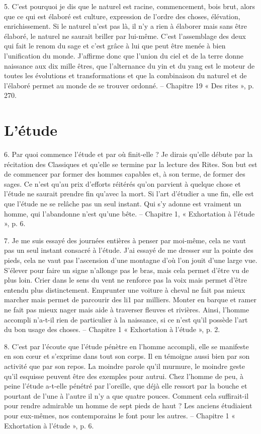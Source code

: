5.	C’est pourquoi je dis que le naturel est racine, commencement, bois brut, alors que ce qui est élaboré est culture, expression de l’ordre des choses, élévation, enrichissement. Si le naturel n’est pas là, il n’y a rien à élaborer mais sans être élaboré, le naturel ne saurait briller par lui-même. C’est l’assemblage des deux qui fait le renom du sage et c’est grâce à lui que peut être menée à bien l’unification du monde. J’affirme donc que l’union du ciel et de la terre donne naissance aux dix mille êtres, que l’alternance du yin et du yang est le moteur de toutes les évolutions et transformations et que la combinaison du naturel et de l’élaboré permet au monde de se trouver ordonné.
-- Chapitre 19 « Des rites », p. 270.


\section{L’étude}


6.	Par quoi commence l’étude et par où finit-elle ? Je dirais qu’elle débute par la récitation des Classiques et qu’elle se termine par la lecture des Rites. Son but est de commencer par former des hommes capables et, à son terme, de former des sages. Ce n’est qu’au prix d’efforts réitérés qu’on parvient à quelque chose et l’étude ne saurait prendre fin qu’avec la mort. Si l’art d’étudier a une fin, elle est que l’étude ne se relâche pas un seul instant. Qui s’y adonne est vraiment un homme, qui l’abandonne n’est qu’une bête.
-- Chapitre 1, « Exhortation à l’étude », p. 6.

7.	Je me suis essayé des journées entières à penser par moi-même, cela ne vaut pas un seul instant consacré à l’étude. J’ai essayé de me dresser sur la pointe des pieds, cela ne vaut pas l’ascension d’une montagne d’où l’on jouit d’une large vue. S’élever pour faire un signe n’allonge pas le bras, mais cela permet d’être vu de plus loin. Crier dans le sens du vent ne renforce pas la voix mais permet d’être entendu plus distinctement. Emprunter une voiture à cheval ne fait pas mieux marcher mais permet de parcourir des li1 par milliers. Monter en barque et ramer ne fait pas
 mieux nager mais aide à traverser fleuves et rivières. Ainsi, l’homme accompli n’a-t-il rien de particulier à la naissance, si ce n’est qu’il possède l’art du bon usage des choses.
-- Chapitre 1 « Exhortation à l’étude », p. 2.

8.	C’est par l’écoute que l’étude pénètre en l’homme accompli, elle se manifeste en son cœur et s’exprime dans tout son corps. Il en témoigne aussi bien par son activité que par son repos. La moindre parole qu’il murmure, le moindre geste qu’il esquisse peuvent être des exemples pour autrui. Chez l’homme de peu, à peine l’étude a-t-elle pénétré par l’oreille, que déjà elle ressort par la bouche et pourtant de l’une à l’autre il n’y a que quatre pouces. Comment cela suffirait-il pour rendre admirable un homme de sept pieds de haut ? Les anciens étudiaient pour eux-mêmes, nos contemporains le font pour les autres.
-- Chapitre 1 « Exhortation à l’étude », p. 6.

